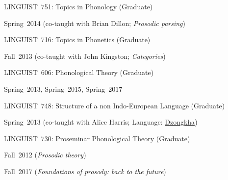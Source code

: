 \documentclass[10pt]{article}
\newcommand{\halfblankline}{\quad\vspace{-0.5\baselineskip}\pagebreak[3]}
\begin{document}
\begin{outerlist}
\begin{innerlist}
        \halfblankline

        \item LINGUIST~751:
          Topics in Phonology (Graduate)
        \begin{innerlist}[\enskip$\circ$,leftmargin=*]
            \item Spring~2014 (co-taught with Brian Dillon;
              \emph{Prosodic parsing})
        \end{innerlist}

        \halfblankline

        \item LINGUIST~716:
          Topics in Phonetics (Graduate)
        \begin{innerlist}[\enskip$\circ$,leftmargin=*]
            \item Fall~2013 (co-taught with John Kingston; \emph{Categories})
        \end{innerlist}

        \halfblankline

        \item LINGUIST~606:
          Phonological Theory (Graduate)
        \begin{innerlist}[\enskip$\circ$,leftmargin=*]
            \item Spring~2013, Spring~2015, Spring~2017
        \end{innerlist}

        \halfblankline

        \item LINGUIST~748:
          Structure of a non Indo-European Language (Graduate)
        \begin{innerlist}[\enskip$\circ$,leftmargin=*]
            \item Spring~2013 (co-taught with Alice Harris; Language: \href{http://www.ethnologue.com/language/dzo}{Dzongkha})
        \end{innerlist}

        \halfblankline

        \item LINGUIST~730:
          Proseminar Phonological Theory (Graduate)
        \begin{innerlist}[\enskip$\circ$,leftmargin=*]
            \item Fall~2012 (\emph{Prosodic theory})
            \item Fall~2017 (\emph{Foundations of prosody: back to the future})
        \end{innerlist}

    \end{innerlist}

\end{outerlist}
\end{document}
